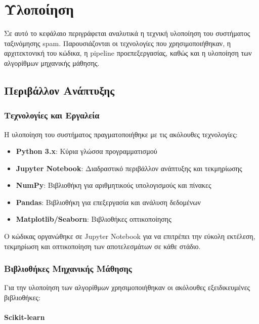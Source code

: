 \documentclass[12pt,a4paper,twoside]{book}
\begin{document}
\chapter{Υλοποίηση}

Σε αυτό το κεφάλαιο περιγράφεται αναλυτικά η τεχνική υλοποίηση του συστήματος ταξινόμησης spam. Παρουσιάζονται οι τεχνολογίες που χρησιμοποιήθηκαν, η αρχιτεκτονική του κώδικα, η pipeline προεπεξεργασίας, καθώς και η υλοποίηση των αλγορίθμων μηχανικής μάθησης.

\section{Περιβάλλον Ανάπτυξης}

\subsection{Τεχνολογίες και Εργαλεία}

Η υλοποίηση του συστήματος πραγματοποιήθηκε με τις ακόλουθες τεχνολογίες:

\begin{itemize}
    \item \textbf{Python 3.x}: Κύρια γλώσσα προγραμματισμού
    \item \textbf{Jupyter Notebook}: Διαδραστικό περιβάλλον ανάπτυξης και τεκμηρίωσης
    \item \textbf{NumPy}: Βιβλιοθήκη για αριθμητικούς υπολογισμούς και πίνακες
    \item \textbf{Pandas}: Βιβλιοθήκη για επεξεργασία και ανάλυση δεδομένων
    \item \textbf{Matplotlib/Seaborn}: Βιβλιοθήκες οπτικοποίησης
\end{itemize}

Ο κώδικας οργανώθηκε σε Jupyter Notebook για να επιτρέπει την εύκολη εκτέλεση, τεκμηρίωση και οπτικοποίηση των αποτελεσμάτων σε κάθε στάδιο.

\subsection{Βιβλιοθήκες Μηχανικής Μάθησης}

Για την υλοποίηση των αλγορίθμων χρησιμοποιήθηκαν οι ακόλουθες εξειδικευμένες βιβλιοθήκες:

\subsubsection{Scikit-learn}
\end{document}
